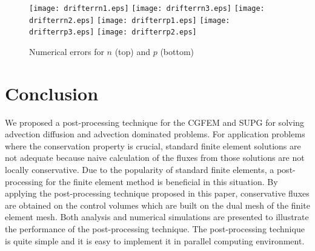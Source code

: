 \documentclass[times]{nlaauth}
\numberwithin{equation}{section}
\begin{document}
\begin{figure} 
\centering
\texttt{[image: drifterrn1.eps]}
\texttt{[image: drifterrn3.eps]}
\texttt{[image: drifterrn2.eps]}
\texttt{[image: drifterrp1.eps]}
\texttt{[image: drifterrp3.eps]}
\texttt{[image: drifterrp2.eps]}
\caption{Numerical errors for $n$ (top) and $p$ (bottom)}
\label{fig:drift}
\end{figure}

\section{Conclusion}
We proposed a post-processing technique for the CGFEM and SUPG for solving advection diffusion and advection dominated problems. For application problems where the conservation property is crucial, standard finite element solutions are
not adequate because naive calculation of the fluxes from those solutions are not locally conservative. Due to the popularity of standard finite elements, a post-processing for the finite element method is beneficial in this situation. By applying the post-processing technique proposed in this paper, conservative fluxes are obtained on the control volumes which are built on the dual mesh of the finite element mesh. Both analysis and numerical simulations are presented to illustrate the performance of the post-processing technique. The post-processing technique is quite simple and it is easy to implement it  in parallel computing environment.



\end{document}
